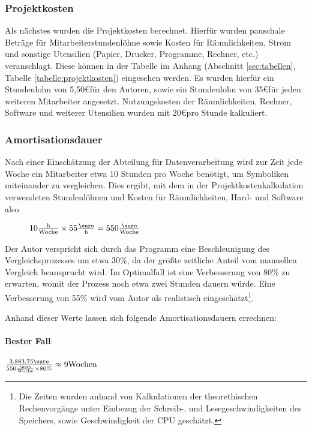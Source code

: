 \subsubsection{Projektkosten}
Als nächstes wurden die Projektkosten berechnet. Hierfür wurden pauschale Beträge 
für Mitarbeiterstundenlöhne sowie Kosten für Räumlichkeiten, Strom und sonstige Utensilien 
(Papier, Drucker, Programme, Rechner, etc.) veranschlagt. Diese können in der Tabelle im
Anhang (Abschnitt \ref{sec:tabellen}, Tabelle \ref{tabelle:projektkosten}) eingesehen werden. Es wurden hierfür
ein Stundenlohn von 5,50\euro für den Autoren, sowie ein Stundenlohn von 35\euro  für jeden
weiteren Mitarbeiter angesetzt. Nutzungskosten der Räumlichkeiten, Rechner, Software
und weiterer Utensilien wurden mit 20\euro  pro Stunde kalkuliert. \par


\subsubsection{Amortisationsdauer}
Nach einer Einschätzung der Abteilung für Datenverarbeitung wird zur Zeit jede 
Woche ein Mitarbeiter etwa 10 Stunden pro Woche benötigt, um Symboliken miteinander 
zu vergleichen. Dies ergibt, mit dem in der Projektkostenkalkulation verwendeten
Stundenlöhnen und Kosten für Räumlichkeiten, Hard- und Software also 
\begin{figure}[!htp]
 $10\frac{\text{h}}{\text{Woche}} \times 55\frac{\text{\euro}}{\text{h}} = 550\frac{\text{\euro}}{\text{Woche}}$
\end{figure}

Der Autor verspricht sich durch das Programm eine Beschleunigung des 
Vergleichsprozesses um etwa 30\%, da der größte zeitliche Anteil vom manuellen 
Vergleich beansprucht wird. Im Optimalfall ist eine Verbesserung von 80\% zu 
erwarten, womit der Prozess noch etwa zwei Stunden dauern würde. Eine Verbesserung 
von 55\% wird vom Autor als realistisch eingeschätzt\footnote{Die Zeiten wurden 
anhand von Kalkulationen der theorethischen Rechenvorgänge unter Einbezug der 
Schreib-, und Lesegeschwindigkeiten des Speichers, sowie Geschwindigkeit der CPU geschätzt.}.

Anhand dieser Werte lassen sich folgende Amortisationsdauern errechnen:\\
\\

\textbf{Bester Fall}: \\
\\
$\frac{3.883,75\text{\euro}}{550\frac{\text{\euro}}{\text{Woche}} \times 80\text{\%}} \approx 9 \text{Wochen}$
\\

